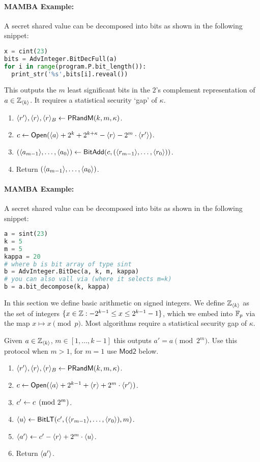 \paragraph{MAMBA Example:} A secret shared value can be decomposed into bits as shown in the following snippet:
\begin{lstlisting}[language={python}]
x = cint(23)
bits = AdvInteger.BitDecFull(a)
for i in range(program.P.bit_length()):
  print_str('%s',bits[i].reveal())
\end{lstlisting}


This outputs the $m$ least significant bits in the $2$'s complement
representation of $a \in {\mathbb{Z}}_{\langle k \rangle}$.
It requires a statistical security `gap' of $\kappa$.
\begin{enumerate}
\item $\langle r' \rangle, \langle r \rangle, \langle r \rangle_B \leftarrow \mathsf{PRandM}(k,m,\kappa)$.
\item $c \leftarrow {\mathsf{Open}}(\langle a \rangle+2^k+2^{k+\kappa}-\langle r \rangle-2^m \cdot \langle r' \rangle)$.
\item $(\langle a_{m-1} \rangle,\ldots,\langle a_0 \rangle) \leftarrow
        \mathsf{BitAdd}(c,(\langle r_{m-1} \rangle,\ldots,\langle r_0 \rangle))$.
\item Return $(\langle a_{m-1} \rangle,\ldots,\langle a_0 \rangle)$.
\end{enumerate}
\paragraph{MAMBA Example:} A secret shared value can be decomposed into bits as shown in the following snippet:
\begin{lstlisting}[language={python}]
a = sint(23)
k = 5
m = 5
kappa = 20
# where b is bit array of type sint
b = AdvInteger.BitDec(a, k, m, kappa)
# you can also vall via (where it selects m=k)
b = a.bit_decompose(k, kappa)
\end{lstlisting}

In this section we define basic arithmetic on signed integers.
We define ${\mathbb{Z}}_{\langle k \rangle}$ as the set of integers $\{x \in {\mathbb{Z}}: -2^{k-1} \le x \le 2^{k-1}-1\}$,
which we embed into ${\mathbb{F}}_p$ via the map $x \mapsto x \pmod{p}$.
Most algorithms require a statistical security gap of $\kappa$.


Given $a \in {\mathbb{Z}}_{\langle k \rangle}$, $m \in [1,\ldots,k-1]$ this outputs $a' = a \pmod{2^m}$.
Use this protocol when $m>1$, for $m=1$ use $\mathsf{Mod2}$ below.
\begin{enumerate}
\item $\langle r' \rangle, \langle r \rangle, \langle r \rangle_B \leftarrow \mathsf{PRandM}(k,m,\kappa)$.
\item $c \leftarrow {\mathsf{Open}}(\langle a \rangle+2^{k-1}+\langle r \rangle+2^m \cdot \langle r' \rangle)$.
\item $c'\leftarrow c \pmod{2^m}$.
\item $\langle u \rangle \leftarrow \mathsf{BitLT}(c',(\langle r_{m-1} \rangle,\ldots,\langle r_0 \rangle),m)$.
\item $\langle a' \rangle \leftarrow c'-\langle r \rangle+2^m \cdot \langle u \rangle$.
\item Return $\langle a' \rangle$.
\end{enumerate}

